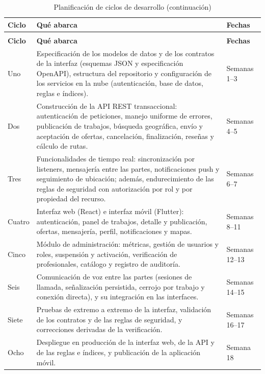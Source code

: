 \documentclass[doc,12pt,a4paper]{apa7}
\begin{document}
\begin{longtable}{|P{2.2cm}|L{8.4cm}|P{3.4cm}|}
\caption{Planificación de ciclos de desarrollo}\\
\hline
\textbf{Ciclo} & \textbf{Qué abarca} & \textbf{Fechas} \\ \hline
\endfirsthead
\caption[]{Planificación de ciclos de desarrollo (continuación)}\\
\hline
\textbf{Ciclo} & \textbf{Qué abarca} & \textbf{Fechas} \\ \hline
\endhead
\hline
\endfoot

Uno & Especificación de los modelos de datos y de los contratos de la interfaz (esquemas JSON y especificación OpenAPI), estructura del repositorio y configuración de los servicios en la nube (autenticación, base de datos, reglas e índices). & Semanas 1--3 \\ \hline

Dos & Construcción de la API REST transaccional: autenticación de peticiones, manejo uniforme de errores, publicación de trabajos, búsqueda geográfica, envío y aceptación de ofertas, cancelación, finalización, reseñas y cálculo de rutas. & Semanas 4--5 \\ \hline

Tres & Funcionalidades de tiempo real: sincronización por listeners, mensajería entre las partes, notificaciones push y seguimiento de ubicación; además, endurecimiento de las reglas de seguridad con autorización por rol y por propiedad del recurso. & Semanas 6--7 \\ \hline

Cuatro & Interfaz web (React) e interfaz móvil (Flutter): autenticación, panel de trabajos, detalle y publicación, ofertas, mensajería, perfil, notificaciones y mapas. & Semanas 8--11 \\ \hline

Cinco & Módulo de administración: métricas, gestión de usuarios y roles, suspensión y activación, verificación de profesionales, catálogo y registro de auditoría. & Semanas 12--13 \\ \hline

Seis & Comunicación de voz entre las partes (sesiones de llamada, señalización persistida, cerrojo por trabajo y conexión directa), y su integración en las interfaces. & Semanas 14--15 \\ \hline

Siete & Pruebas de extremo a extremo de la interfaz, validación de los contratos y de las reglas de seguridad, y correcciones derivadas de la verificación. & Semanas 16--17 \\ \hline

Ocho & Despliegue en producción de la interfaz web, de la API y de las reglas e índices, y publicación de la aplicación móvil. & Semana 18 \\ \hline
\end{longtable}
\end{document}
